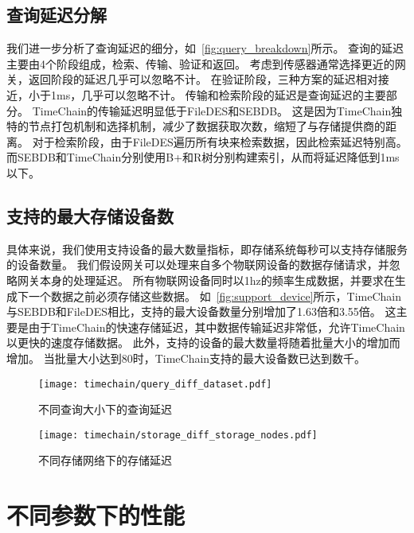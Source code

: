 \subsection{查询延迟分解}
我们进一步分析了查询延迟的细分，如~\autoref{fig:query_breakdown}所示。
查询的延迟主要由4个阶段组成，检索、传输、验证和返回。
考虑到传感器通常选择更近的网关，返回阶段的延迟几乎可以忽略不计。
在验证阶段，三种方案的延迟相对接近，小于1ms，几乎可以忽略不计。
传输和检索阶段的延迟是查询延迟的主要部分。
TimeChain的传输延迟明显低于FileDES和SEBDB。
这是因为TimeChain独特的节点打包机制和选择机制，减少了数据获取次数，缩短了与存储提供商的距离。
对于检索阶段，由于FileDES遍历所有块来检索数据，因此检索延迟特别高。
而SEBDB和TimeChain分别使用B+和R树分别构建索引，从而将延迟降低到1ms以下。

\subsection{支持的最大存储设备数}
具体来说，我们使用支持设备的最大数量指标，即存储系统每秒可以支持存储服务的设备数量。
我们假设网关可以处理来自多个物联网设备的数据存储请求，并忽略网关本身的处理延迟。
所有物联网设备同时以1hz的频率生成数据，并要求在生成下一个数据之前必须存储这些数据。
如~\autoref{fig:support_device}所示，TimeChain与SEBDB和FileDES相比，支持的最大设备数量分别增加了1.63倍和3.55倍。
这主要是由于TimeChain的快速存储延迟，其中数据传输延迟非常低，允许TimeChain以更快的速度存储数据。
此外，支持的设备的最大数量将随着批量大小的增加而增加。
当批量大小达到80时，TimeChain支持的最大设备数已达到数千。

\begin{figure}[t]
    \centering
	\begin{minipage}{0.45\linewidth}
        \centering
        \texttt{[image: timechain/query\_diff\_dataset.pdf]}
        \caption{不同查询大小下的查询延迟}
        \label{fig:query_diff_dataset}
	\end{minipage}
	\quad
	\begin{minipage}{0.45\linewidth}
        \centering
        \texttt{[image: timechain/storage\_diff\_storage\_nodes.pdf]}
        \caption{不同存储网络下的存储延迟}
        \label{fig:storage_diff_storage_nodes}
    \end{minipage}
\end{figure}

\section{不同参数下的性能}
